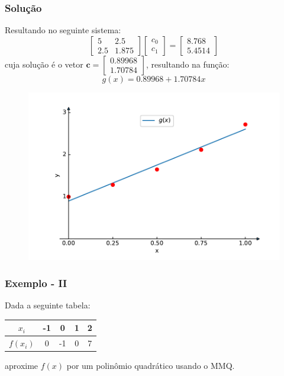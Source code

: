 \documentclass{beamer}
\theoremstyle{mystyle}
\begin{document}
	\begin{frame}
		\frametitle{Solução}
		Resultando no seguinte sistema:
		\begin{equation*}
			\left[ \begin{array}{cc}
				5 &  2.5 \\
				2.5 & 1.875
			\end{array}\right]
			\left[ \begin{array}{c}
				c_{0}\\
				c_{1}
			\end{array} \right]
			= \left[ \begin{array}{c}
				8.768\\
				5.4514
			\end{array} \right]
		\end{equation*}
		cuja solução é o vetor $ \mathbf{c} = \left[ \begin{array}{c}
			0.89968\\
			1.70784
		\end{array} \right]  $, resultando na função:
		\begin{equation*}
			g(x) = 0.89968 + 1.70784x
		\end{equation*}
	\end{frame}

	\begin{frame}
		\begin{figure}
			\centering
			\includegraphics[width=1.0\linewidth]{Figuras/grafico_05}
			\label{fig:grafico05}
		\end{figure}
	\end{frame}

	\begin{frame}
		\frametitle{Exemplo - II}
		Dada a seguinte tabela:
		\begin{table}
			\small 
			\centering
			\begin{tabular}{c|cccc}
				$ x_{i} $ & -1 & 0 & 1 & 2 \\
				\hline
				$ f(x_{i}) $ & 0 & -1 & 0 & 7 
			\end{tabular}
		\end{table}
		aproxime $ f (x) $ por um polinômio quadrático usando o MMQ.
	\end{frame}
	
\end{document}
